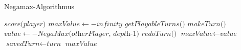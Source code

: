 \begin{algorithm}
\caption{Negamax-Algorithmus}
\begin{algorithmic}[1]
\State \Return $\textit{score(player)}$
\EndIf
\State $\textit{maxValue} \gets -\textit{infinity}$
\State $\textit{getPlayableTurns()}$
\State $\textit{makeTurn()}$
\State $\textit{value} \gets -\textit{NegaMax(otherPlayer, depth-1)}$
\State $\textit{redoTurn()}$
\State $\textit{maxValue} \gets \textit{value}$
\State $\textit{savedTurn} \gets \textit{turn}$
\EndIf
\EndIf
\EndWhile
\State \Return $\textit{maxValue}$
\EndProcedure
\end{algorithmic}
\end{algorithm}